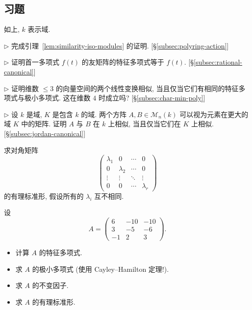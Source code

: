 \subsection*{习题}
{}

如上, $k$ 表示域.

\begin{prob}\label{ex:complete-lemma-7-2}
$\triangleright$ 完成引理~\ref{lem:similarity-iso-modules} 的证明. [§\ref{subsec:polyring-action}]
\end{prob}

\begin{prob}\label{ex:companion-charpoly}
$\triangleright$ 证明首一多项式 $f(t)$ 的友矩阵的特征多项式等于 $f(t)$. [§\ref{subsec:rational-canonical}]
\end{prob}

\begin{prob}\label{ex:dim3-similarity-criterion}
$\triangleright$ 证明维数 $\le3$ 的向量空间的两个线性变换相似, 当且仅当它们有相同的特征多项式与极小多项式. 这在维数 $4$ 时成立吗? [§\ref{subsec:char-min-poly}]
\end{prob}

\begin{prob}\label{ex:similarity-over-extension}
$\triangleright$ 设 $k$ 是域, $K$ 是包含 $k$ 的域. 两个方阵 $A,B\in\mathcal{M}_n(k)$ 可以视为元素在更大的域 $K$ 中的矩阵. 证明 $A$ 与 $B$ 在 $k$ 上相似, 当且仅当它们在 $K$ 上相似. [§\ref{subsec:jordan-canonical}]
\end{prob}

\begin{prob}\label{ex:rational-canonical-of-diagonal}
求对角矩阵
\[
\begin{pmatrix}
\lambda_1&0&\cdots&0\\
0&\lambda_2&\cdots&0\\
\vdots&\vdots&\ddots&\vdots\\
0&0&\cdots&\lambda_r
\end{pmatrix}
\]
的有理标准形, 假设所有的 $\lambda_i$ 互不相同.
\end{prob}

\begin{prob}\label{ex:compute-rational-canonical}
设
\[
A=\begin{pmatrix}
6&-10&-10\\
3&-5&-6\\
-1&2&3
\end{pmatrix}.
\]
\begin{itemize}
	\item 计算 $A$ 的特征多项式.
	\item 求 $A$ 的极小多项式 (使用 Cayley--Hamilton 定理!).
	\item 求 $A$ 的不变因子.
	\item 求 $A$ 的有理标准形.
\end{itemize}
\end{prob}

